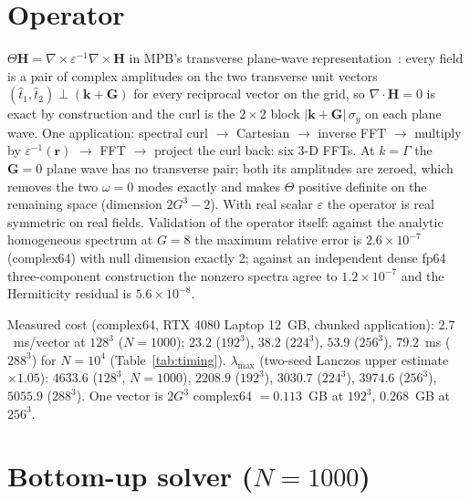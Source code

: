 \documentclass[aps,prl,preprint,superscriptaddress,longbibliography,nofootinbib]{revtex4-2}
\begin{document}
\section{Operator}
$\Theta\bm H=\nabla\times\varepsilon^{-1}\nabla\times\bm H$ in MPB's transverse plane-wave representation~\cite{Johnson2001}: every field is a pair of complex amplitudes on the two transverse unit vectors $(\hat t_1,\hat t_2)\perp(\bm k+\bm G)$ for every reciprocal vector on the grid, so $\nabla\cdot\bm H=0$ is exact by construction and the curl is the $2\times2$ block $|\bm k+\bm G|\,\sigma_y$ on each plane wave. One application: spectral curl $\to$ Cartesian $\to$ inverse FFT $\to$ multiply by $\varepsilon^{-1}(\bm r)$ $\to$ FFT $\to$ project the curl back: six 3-D FFTs. At $k=\Gamma$ the $\bm G=0$ plane wave has no transverse pair; both its amplitudes are zeroed, which removes the two $\omega=0$ modes exactly and makes $\Theta$ positive definite on the remaining space (dimension $2G^3-2$). With real scalar $\varepsilon$ the operator is real symmetric on real fields. Validation of the operator itself: against the analytic homogeneous spectrum at $G=8$ the maximum relative error is $2.6\times10^{-7}$ (complex64) with null dimension exactly 2; against an independent dense fp64 three-component construction the nonzero spectra agree to $1.2\times10^{-7}$ and the Hermiticity residual is $5.6\times10^{-8}$.

Measured cost (complex64, RTX 4080 Laptop 12~GB, chunked application): $2.7$~ms/vector at $128^3$ ($N=1000$); $23.2$ ($192^3$), $38.2$ ($224^3$), $53.9$ ($256^3$), $79.2$~ms ($288^3$) for $N=10^4$ (Table~\ref{tab:timing}). $\lambda_{\max}$ (two-seed Lanczos upper estimate $\times1.05$): $4633.6$ ($128^3$, $N=1000$), $2208.9$ ($192^3$), $3030.7$ ($224^3$), $3974.6$ ($256^3$), $5055.9$ ($288^3$). One vector is $2G^3$ complex64 $=0.113$~GB at $192^3$, $0.268$~GB at $256^3$.

\begin{table}
\caption{Operator application time and spectral extent per grid ($N=10^4$, circular decoration; \texttt{results/exp/n10k\_G*\_timing.json}).}
\label{tab:timing}

\end{table}

\section{Bottom-up solver ($N=1000$)}
\end{document}
